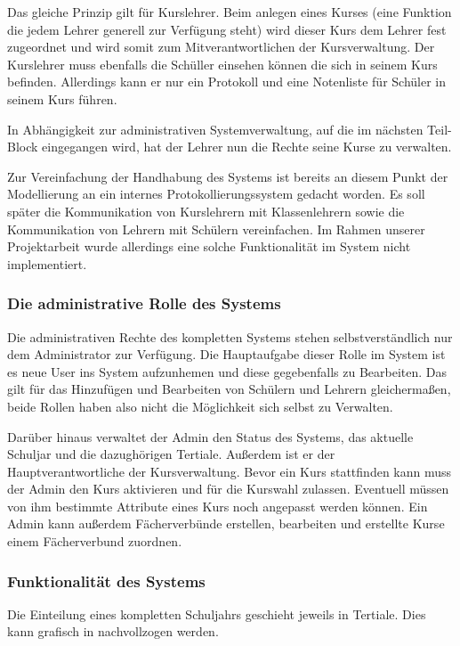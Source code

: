 Das gleiche Prinzip gilt für Kurslehrer. 
Beim anlegen eines Kurses (eine Funktion die jedem Lehrer generell zur Verfügung steht) wird dieser Kurs dem Lehrer fest zugeordnet und wird somit zum Mitverantwortlichen der Kursverwaltung. 
Der Kurslehrer muss ebenfalls die Schüller einsehen können die sich in seinem Kurs befinden. Allerdings kann er nur ein Protokoll und eine Notenliste für Schüler in seinem Kurs führen.

In Abhängigkeit zur administrativen Systemverwaltung, auf die im nächsten Teil-Block eingegangen wird, hat der Lehrer nun die Rechte seine Kurse zu verwalten.

Zur Vereinfachung der Handhabung des Systems ist bereits an diesem Punkt der Modellierung an ein internes Protokollierungssystem gedacht worden. 
Es soll später die Kommunikation von Kurslehrern mit Klassenlehrern sowie die Kommunikation von Lehrern mit Schülern vereinfachen.
Im Rahmen unserer Projektarbeit wurde allerdings eine solche Funktionalität im System nicht implementiert.

\subsubsection{Die administrative Rolle des Systems}

Die administrativen Rechte des kompletten Systems stehen selbstverständlich nur dem Administrator zur Verfügung. Die Hauptaufgabe dieser Rolle im System ist es neue User ins System aufzunhemen und diese gegebenfalls zu Bearbeiten.
Das gilt für das Hinzufügen und Bearbeiten von Schülern und Lehrern gleichermaßen, beide Rollen haben also nicht die Möglichkeit sich selbst zu Verwalten.

Darüber hinaus verwaltet der Admin den Status des Systems, das aktuelle Schuljar und die dazughörigen Tertiale. Außerdem ist er der Hauptverantwortliche der Kursverwaltung.
Bevor ein Kurs stattfinden kann muss der Admin den Kurs aktivieren und für die Kurswahl zulassen. Eventuell müssen von ihm bestimmte Attribute eines Kurs noch angepasst werden können.
Ein Admin kann außerdem Fächerverbünde erstellen, bearbeiten und erstellte Kurse einem Fächerverbund zuordnen.

\subsubsection{Funktionalität des Systems}

Die Einteilung eines kompletten Schuljahrs geschieht jeweils in Tertiale. Dies kann grafisch in  nachvollzogen werden. 

